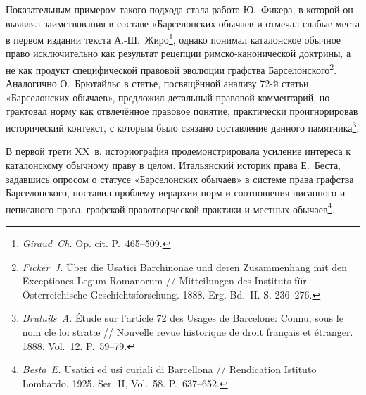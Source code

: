 Показательным примером такого подхода стала работа Ю.~Фикера, в которой он выявлял заимствования в составе «Барселонских обычаев и отмечал слабые места в первом издании текста А.-Ш.~Жиро\footnote{\emph{Giraud}\emph{~}\emph{Ch.} Op. cit. P.~465--509.}, однако понимал каталонское обычное право исключительно как результат рецепции римско-канонической доктрины, а не как продукт специфической правовой эволюции графства Барселонского\footnote{\emph{Ficker~J.} Über die Usatici Barchinonae und deren Zusammenhang mit den Exceptiones Legum Romanorum // Mitteilungen des Instituts für Österreichische Geschichtsforschung. 1888. Erg.-Bd.~II. S. 236--276.}. Аналогично О.~Брютайльс в статье, посвящённой анализу 72-й статьи «Барселонских обычаев», предложил детальный правовой комментарий, но трактовал норму как отвлечённое правовое понятие, практически проигнорировав исторический контекст, с которым было связано составление данного памятника\footnote{\emph{Brutails}\emph{~}\emph{A.} Étude sur l’article 72 des Usages de Barcelone: Connu, sous le nom cle loi stratæ // Nouvelle revue historique de droit français et étranger. 1888. Vol.~12. P.~59--79.}.

В первой трети XX~в. историография продемонстрировала усиление интереса к каталонскому обычному праву в целом. Итальянский историк права Е.~Беста, задавшись опросом о статусе «Барселонских обычаев» в системе права графства Барселонского, поставил проблему иерархии норм и соотношения писанного и неписаного права, графской правотворческой практики и местных обычаев\footnote{\emph{Besta~E.} Usatici ed usi curiali di Barcellona // Rendication Istituto Lombardo. 1925. Ser. II, Vol.~58. P.~637--652.}.

